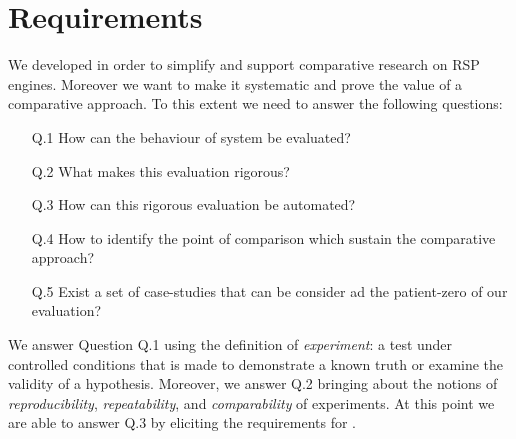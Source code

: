 \section{Requirements} \label{sec:requirements}

We developed \name in order to simplify and support comparative research on RSP engines. Moreover we want to make it systematic  and prove the value of a comparative approach. To this extent we need to answer the following questions: 
\begin{enumerate}
\item[Q.1] How can the behaviour of system be evaluated? 
\item[Q.2] What makes this evaluation rigorous? %
\item[Q.3] How can this rigorous evaluation be automated? %
\item[Q.4] How to identify the point of comparison which sustain the comparative approach? %
\item[Q.5] Exist a set of case-studies that can be consider ad the patient-zero of our evaluation? %
\end{enumerate}


We answer Question Q.1 using the definition of \textit{experiment}: a test under controlled conditions that is made to demonstrate a known truth or examine the validity of a hypothesis.
Moreover, we answer Q.2 bringing about the notions of  \textit{reproducibility}, \textit{repeatability}, and \textit{comparability} of experiments.
At this point we are able to answer Q.3 by eliciting the requirements for \name.

